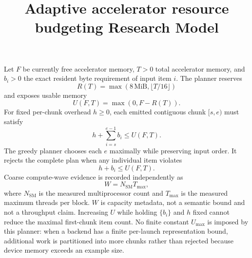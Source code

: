 \documentclass{article}
\title{Adaptive accelerator resource budgeting Research Model}
\begin{document}
\maketitle
Let $F$ be currently free accelerator memory, $T>0$ total accelerator
memory, and $b_i>0$ the exact resident byte requirement of input item $i$. The
planner reserves
\[
  R(T)=\max(8\,\mathrm{MiB},\lfloor T/16\rfloor)
\]
and exposes usable memory
\[
  U(F,T)=\max(0,F-R(T)).
\]
For fixed per-chunk overhead $h\ge 0$, each emitted contiguous chunk
$[s,e)$ must satisfy
\[
  h+\sum_{i=s}^{e-1} b_i \le U(F,T).
\]
The greedy planner chooses each $e$ maximally while preserving input order. It
rejects the complete plan when any individual item violates
\[
  h+b_i \le U(F,T).
\]
Coarse compute-wave evidence is recorded independently as
\[
  W = N_{\mathrm{SM}} T_{\max},
\]
where $N_{\mathrm{SM}}$ is the measured multiprocessor count and $T_{\max}$
is the measured maximum threads per block. $W$ is capacity metadata, not a
semantic bound and not a throughput claim. Increasing $U$ while holding
$\{b_i\}$ and $h$ fixed cannot reduce the maximal first-chunk item count. No
finite constant $U_{\max}$ is imposed by this planner: when a backend has a
finite per-launch representation bound, additional work is partitioned into more
chunks rather than rejected because device memory exceeds an example size.
\end{document}

